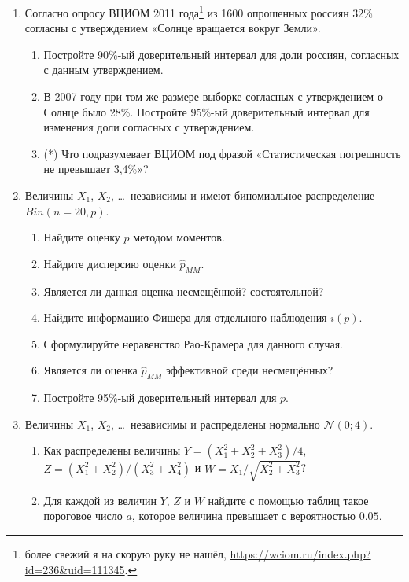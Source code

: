 \documentclass[12pt, a4paper]{article}\usepackage[]{graphicx}\usepackage[]{color}
\newcommand{\cN}{\mathcal{N}}
\begin{document}
\begin{enumerate}
							\item  Согласно опросу ВЦИОМ 2011 года\footnote{более свежий я на скорую руку не нашёл, \url{https://wciom.ru/index.php?id=236&uid=111345}.} из 1600 опрошенных россиян 32\% согласны с утверждением «Солнце вращается вокруг Земли».

							\begin{enumerate}
								\item Постройте 90\%-ый доверительный интервал для доли россиян, согласных с данным утверждением.
								\item В 2007 году при том же размере выборке согласных с утверждением о Солнце было 28\%. Постройте 95\%-ый доверительный интервал для изменения доли согласных с утверждением.
								\item (*) Что подразумевает ВЦИОМ под фразой «Статистическая погрешность не превышает 3,4\%»?
							\end{enumerate}

							\item Величины $X_1$, $X_2$, \ldots~независимы и имеют биномиальное распределение $Bin(n=20, p)$.
							\begin{enumerate}
								\item Найдите оценку $p$ методом моментов.
								\item Найдите дисперсию оценки $\hat p_{MM}$.
								\item Является ли данная оценка несмещённой? состоятельной?
								\item Найдите информацию Фишера для отдельного наблюдения $i(p)$.
								\item Сформулируйте неравенство Рао-Крамера для данного случая.
								\item Является ли оценка $\hat p_{MM}$ эффективной среди несмещённых?
								\item Постройте 95\%-ый доверительный интервал для $p$.
							\end{enumerate}

							\item Величины $X_1$, $X_2$, \ldots~независимы и распределены нормально $\cN(0; 4)$.
							\begin{enumerate}
								\item Как распределены величины $Y = (X_1^2 + X_2^2 + X_3^2)/4$, $Z = (X_1^2 + X_2^2)/(X_3^2 + X_4^2)$ и $W = X_1 / \sqrt{X_2^2 + X_3^2}$?
								\item Для каждой из величин $Y$, $Z$ и $W$ найдите с помощью таблиц такое пороговое число $a$, которое величина превышает с вероятностью $0.05$.
							\end{enumerate}


\end{enumerate}
\end{document}
